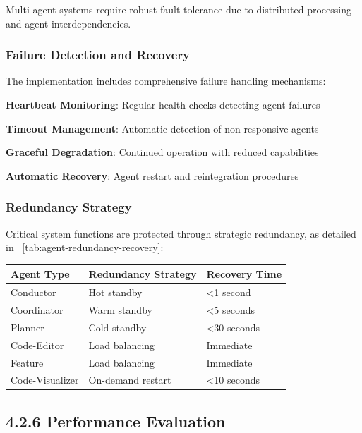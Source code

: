 Multi-agent systems require robust fault tolerance due to distributed processing and agent interdependencies.

\subsubsection*{Failure Detection and Recovery}

The implementation includes comprehensive failure handling mechanisms:

\begin{expandedlist}
    \item \textbf{Heartbeat Monitoring}: Regular health checks detecting agent failures
    \item \textbf{Timeout Management}: Automatic detection of non-responsive agents
    \item \textbf{Graceful Degradation}: Continued operation with reduced capabilities
    \item \textbf{Automatic Recovery}: Agent restart and reintegration procedures
\end{expandedlist}

\subsubsection*{Redundancy Strategy}

Critical system functions are protected through strategic redundancy, as detailed in ~\ref{tab:agent-redundancy-recovery}:

\begin{center}
\begin{tabular}{@{}lll@{}}
\toprule
\textbf{Agent Type} & \textbf{Redundancy Strategy} & \textbf{Recovery Time} \\
\midrule
Conductor & Hot standby & <1 second \\
Coordinator & Warm standby & <5 seconds \\
Planner & Cold standby & <30 seconds \\
Code-Editor & Load balancing & Immediate \\
Feature & Load balancing & Immediate \\
Code-Visualizer & On-demand restart & <10 seconds \\
\bottomrule
\end{tabular}
\label{tab:agent-redundancy-recovery}
\end{center}

\subsection*{4.2.6 Performance Evaluation}

